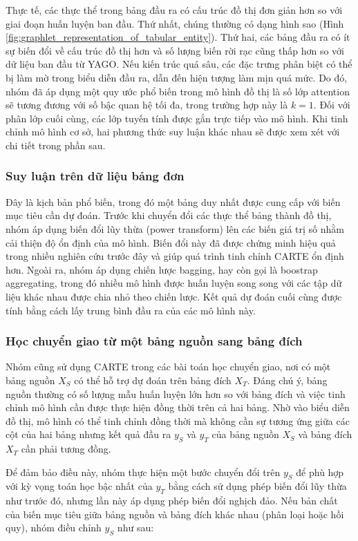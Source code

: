 \documentclass{article}
\begin{document}
Thực tế, các thực thể trong bảng đầu ra có cấu trúc đồ thị đơn giản hơn so với giai đoạn huấn luyện ban đầu. Thứ nhất, chúng thường có dạng hình sao (Hình \ref{fig:graphlet_representation_of_tabular_entity}). Thứ hai, các bảng đầu ra có ít sự biến đổi về cấu trúc đồ thị hơn và số lượng biến rời rạc cũng thấp hơn so với dữ liệu ban đầu từ YAGO. Nếu kiến trúc quá sâu, các đặc trưng phân biệt có thể bị làm mờ trong biểu diễn đầu ra, dẫn đến hiện tượng làm mịn quá mức. Do đó, nhóm đã áp dụng một quy ước phổ biến trong mô hình đồ thị là số lớp attention sẽ tương đương với số bậc quan hệ tối đa, trong trường hợp này là $k=1$. Đối với phân lớp cuối cùng, các lớp tuyến tính được gắn trực tiếp vào mô hình. Khi tinh chỉnh mô hình cơ sở, hai phương thức suy luận khác nhau sẽ được xem xét với chi tiết trong phần sau.

\subsubsection{Suy luận trên dữ liệu bảng đơn}
Đây là kịch bản phổ biến, trong đó một bảng duy nhất được cung cấp với biến mục tiêu cần dự đoán. Trước khi chuyển đổi các thực thể bảng thành đồ thị, nhóm áp dụng biến đổi lũy thừa (power transform) lên các biến giá trị số nhằm cải thiện độ ổn định của mô hình. Biến đổi này đã được chứng minh hiệu quả trong nhiều nghiên cứu trước đây và giúp quá trình tinh chỉnh CARTE ổn định hơn. Ngoài ra, nhóm áp dụng chiến lược bagging, hay còn gọi là boostrap aggregating, trong đó nhiều mô hình được huấn luyện song song với các tập dữ liệu khác nhau được chia nhỏ theo chiến lược. Kết quả dự đoán cuối cùng được tính bằng cách lấy trung bình đầu ra của các mô hình này.

\subsubsection{Học chuyển giao từ một bảng nguồn sang bảng đích}
Nhóm cũng sử dụng CARTE trong các bài toán học chuyển giao, nơi có một bảng nguồn $X_S$ có thể hỗ trợ dự đoán trên bảng đích $X_T$. Đáng chú ý, bảng nguồn thường có số lượng mẫu huấn luyện lớn hơn so với bảng đích và việc tinh chỉnh mô hình cần được thực hiện đồng thời trên cả hai bảng. Nhờ vào biểu diễn đồ thị, mô hình có thể tinh chỉnh đồng thời mà không cần sự tương ứng giữa các cột của hai bảng nhưng kết quả đầu ra $y_S$ và $y_T$ của bảng nguồn $X_S$ và bảng đích $X_T$ cần phải tương đồng.

Để đảm bảo điều này, nhóm thực hiện một bước chuyển đổi trên $y_S$ để phù hợp với kỳ vọng toán học bậc nhất của $y_T$ bằng cách sử dụng phép biến đổi lũy thừa như trước đó, nhưng lần này áp dụng phép biến đổi nghịch đảo. Nếu bản chất của biến mục tiêu giữa bảng nguồn và bảng đích khác nhau (phân loại hoặc hồi quy), nhóm điều chỉnh $y_S$ như sau:
\end{document}
